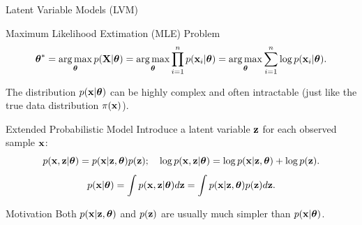 \documentclass{beamer}
\begin{document}
\begin{frame}{Latent Variable Models (LVM)}
	\begin{block}{Maximum Likelihood Extimation (MLE) Problem}
		\vspace{-0.5cm}
		\[
		\boldsymbol{\theta}^* = \operatorname*{arg\,max}_{\boldsymbol{\theta}} p(\mathbf{X} | \boldsymbol{\theta}) = \operatorname*{arg\,max}_{\boldsymbol{\theta}} \prod_{i=1}^n p(\mathbf{x}_i | \boldsymbol{\theta}) = \operatorname*{arg\,max}_{\boldsymbol{\theta}} \sum_{i=1}^n \log p(\mathbf{x}_i | \boldsymbol{\theta}).
		\]
		\vspace{-0.5cm}
	\end{block}
	The distribution $p(\mathbf{x} | \boldsymbol{\theta})$ can be highly complex and often intractable (just like the true data distribution $\pi(\mathbf{x})$).
	\begin{block}{Extended Probabilistic Model}
		Introduce a latent variable $\mathbf{z}$ for each observed sample $\mathbf{x}$:
		\[
		p(\mathbf{x}, \mathbf{z} | \boldsymbol{\theta}) = p(\mathbf{x} | \mathbf{z}, \boldsymbol{\theta}) p(\mathbf{z}); \quad 
		\log p(\mathbf{x}, \mathbf{z} | \boldsymbol{\theta}) = \log p(\mathbf{x} | \mathbf{z}, \boldsymbol{\theta}) + \log p(\mathbf{z}).
		\]
		\[
		p(\mathbf{x} | \boldsymbol{\theta}) = \int p(\mathbf{x}, \mathbf{z} | \boldsymbol{\theta}) d\mathbf{z} = \int p(\mathbf{x} | \mathbf{z}, \boldsymbol{\theta}) p(\mathbf{z}) d\mathbf{z}.
		\]
	\end{block}
	\vspace{-0.3cm}
	\begin{block}{Motivation}
		Both $p(\mathbf{x} | \mathbf{z}, \boldsymbol{\theta})$ and $p(\mathbf{z})$ are usually much simpler than $p(\mathbf{x} | \boldsymbol{\theta})$.
	\end{block}
\end{frame}
\end{document}

